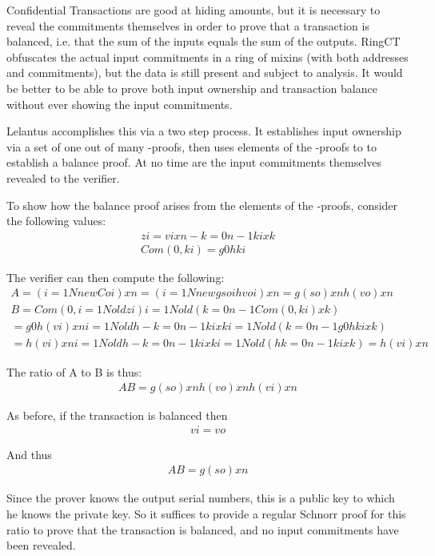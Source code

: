 \documentclass{article}
\begin{document}
Confidential Transactions are good at hiding amounts, but it is necessary to reveal the commitments themselves in order to prove that a transaction is balanced, i.e. that the sum of the inputs equals the sum of the outputs.  RingCT obfuscates the actual input commitments in a ring of mixins (with both addresses and commitments), but the data is still present and subject to analysis.  It would be better to be able to prove both input ownership and transaction balance without ever showing the input commitments.

Lelantus accomplishes this via a two step process.  It establishes input ownership via a set of one out of many -proofs, then uses elements of the -proofs to to establish a balance proof.  At no time are the input commitments themselves revealed to the verifier.

To show how the balance proof arises from the elements of the -proofs, consider the following values:
\begin{eqnarray}
  zi=vixn-k=0n-1kixk\\
  Com(0,ki)=g0hki
\end{eqnarray}

The verifier can then compute the following:
\begin{eqnarray}
  A=(i=1NnewCoi)xn=(i=1Nnewgsoihvoi)xn=g( so) xnh( vo) xn\\
  B=Com(0,i=1Noldzi) i=1Nold(k=0n-1Com(0,ki)xk)\\
  =g0h( vi) xn i=1Noldh-k=0n-1kixki=1Nold(k=0n-1g0hkixk)\\
  =h( vi) xn i=1Noldh-k=0n-1kixki=1Nold(hk=0n-1kixk)=h( vi) xn
\end{eqnarray}

The ratio of A to B is thus:
\begin{eqnarray}
  AB=g( so) xnh( vo) xnh( vi) xn
\end{eqnarray}
  
As before, if the transaction is balanced then 
\begin{eqnarray}
  vi= vo
\end{eqnarray}

And thus
\begin{eqnarray}
  AB=g( so) xn
\end{eqnarray}

Since the prover knows the output serial numbers, this is a public key to which he knows the private key.  So it suffices to provide a regular Schnorr proof for this ratio to prove that the transaction is balanced, and no input commitments have been revealed.
\end{document}
